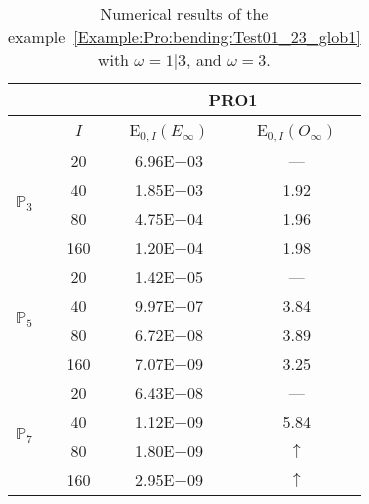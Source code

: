 \begin{table}[H]
\caption{Numerical results of the example~\ref{Example:Pro:bending:Test01_23_glob1} with $\omega=1|3$, and $\omega=3$.}
\setlength{\tabcolsep}{5pt}
\centering
\begin{tabular}{@{}l c c c@{}}
\toprule
 &  & \multicolumn{2}{c}{PRO1}\\
\midrule
 & $I$ & E$_{0,I}(E_{\infty})$ & E$_{0,I}(O_{\infty})$\\
\midrule
\multirow{4}{*}{$\mathbb{P}_{3}$} & 20 & 6.96E$-$03 & ---\\
 & 40 & 1.85E$-$03 & 1.92\\
 & 80 & 4.75E$-$04 & 1.96\\
 & 160 & 1.20E$-$04 & 1.98\\
\midrule
\multirow{4}{*}{$\mathbb{P}_{5}$} & 20 & 1.42E$-$05 & ---\\
 & 40 & 9.97E$-$07 & 3.84\\
 & 80 & 6.72E$-$08 & 3.89\\
 & 160 & 7.07E$-$09 & 3.25\\
\midrule
\multirow{4}{*}{$\mathbb{P}_{7}$} & 20 & 6.43E$-$08 & ---\\
 & 40 & 1.12E$-$09 & 5.84\\
 & 80 & 1.80E$-$09 & $\uparrow$\\
 & 160 & 2.95E$-$09 & $\uparrow$\\
\bottomrule
\end{tabular}
\label{Table:PRO:test_01_23_test19}
\end{table}
